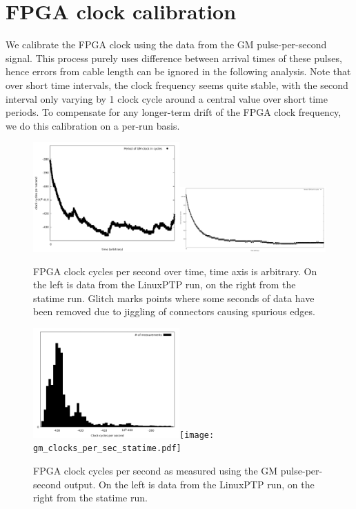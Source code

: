 \documentclass{article}
\begin{document}
\section{FPGA clock calibration}

We calibrate the FPGA clock using the data from the GM pulse-per-second signal. This process purely uses difference between arrival times of these pulses, hence errors from cable length can be ignored in the following analysis. Note that over short time intervals, the clock frequency seems quite stable, with the second interval only varying by 1 clock cycle around a central value over short time periods. To compensate for any longer-term drift of the FPGA clock frequency, we do this calibration on a per-run basis.

\begin{figure}[h]
\includegraphics[width=0.5\textwidth]{gm_secs_overtime_ref.pdf}\includegraphics[width=0.5\textwidth]{gm_secs_overtime_statime.pdf}
\caption{FPGA clock cycles per second over time, time axis is arbitrary. On the left is data from the LinuxPTP run, on the right from the statime run. Glitch marks points where some seconds of data have been removed due to jiggling of connectors causing spurious edges.}
\label{fig:gm_cycles_over_time}
\end{figure}

\begin{figure}[h]
\includegraphics[width=0.5\textwidth]{gm_clocks_per_sec_ref.pdf}\texttt{[image: gm\_clocks\_per\_sec\_statime.pdf]}
\caption{FPGA clock cycles per second as measured using the GM pulse-per-second output. On the left is data from the LinuxPTP run, on the right from the statime run.}
\label{fig:gm_cycles_per_second}
\end{figure}
\end{document}
